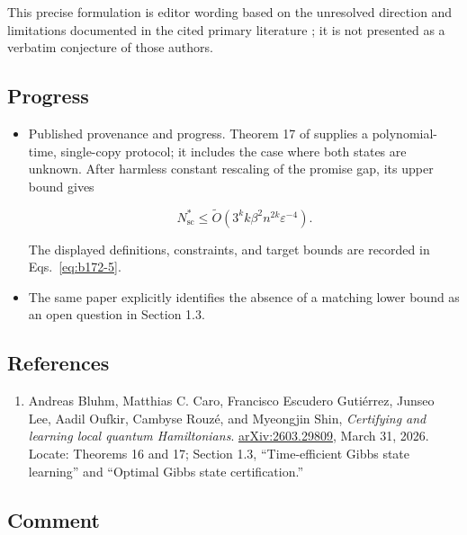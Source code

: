 This precise formulation is editor wording based on the unresolved direction and limitations documented in the cited primary literature ; it is not presented as a verbatim conjecture of those authors.

\subsection*{Progress}

\begin{itemize}
  \item Published provenance and progress. Theorem 17 of  supplies a polynomial-time, single-copy protocol; it includes the case where both states are unknown. After harmless constant rescaling of the promise gap, its upper bound gives

\begin{equation}
N^*_{\mathrm{sc}}
\leq\widetilde O\!\left(
3^k k\beta^2n^{2k}\varepsilon^{-4}
\right).
\label{eq:b172-5}
\end{equation}

The displayed definitions, constraints, and target bounds are recorded in Eqs.~\eqref{eq:b172-5}.

  \item The same paper explicitly identifies the absence of a matching lower bound as an open question in Section 1.3. 
\end{itemize}

\subsection*{References}

\begin{enumerate}[label={},leftmargin=4.8em,labelsep=0.5em]
  \footnotesize
  \item[\textup{[Bluhm26]}]\label{ref:b172-bluhm26}
  Andreas Bluhm, Matthias C. Caro, Francisco Escudero Gutiérrez, Junseo Lee, Aadil Oufkir, Cambyse Rouzé, and Myeongjin Shin, \emph{Certifying and learning local quantum Hamiltonians}. \href{https://arxiv.org/abs/2603.29809}{arXiv:2603.29809}, March 31, 2026. Locate: Theorems 16 and 17; Section 1.3, “Time-efficient Gibbs state learning” and “Optimal Gibbs state certification.”
\end{enumerate}

\subsection*{Comment}


